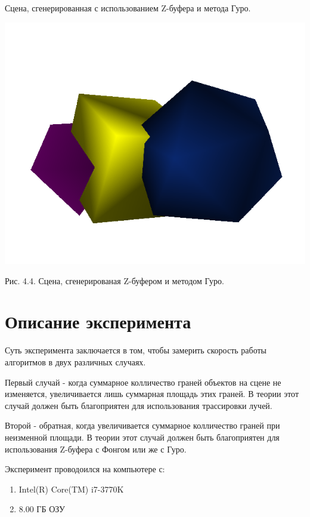 \documentclass[12pt]{report}
\begin{document}
	Сцена, сгенерированная с использованием Z-буфера и метода Гуро.

	\begin{center}
		\includegraphics[scale=0.8]{zg.png}
		
		Рис. 4.4. Сцена, сгенерированая Z-буфером и методом Гуро.
	\end{center}

	\section{Описание эксперимента}
	
	Суть эксперимента заключается в том, чтобы замерить скорость работы алгоритмов в 
	двух различных случаях.
	
	Первый случай - когда суммарное колличество граней объектов на сцене не изменяется, увеличивается лишь суммарная площадь этих граней. В теории этот случай должен быть благоприятен для использования трассировки лучей.
	
	Второй - обратная, когда увеличивается суммарное колличество граней при неизменной площади. В теории этот случай должен быть благоприятен для использования Z-буфера с Фонгом или же с Гуро.
	
	Эксперимент проводоился на компьютере с:
	\begin{enumerate}
		\item Intel(R) Core(TM) i7-3770K
		\item 8.00 ГБ ОЗУ
	\end{enumerate}
\end{document}
